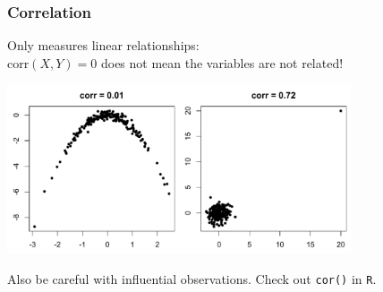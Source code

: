 \documentclass{beamer}
\newcommand{\rd}{\color{burntorange}}
\newcommand{\bk}{\color{black}}
\begin{document}
\begin{frame}
\frametitle{Correlation}

Only measures \rd linear \bk relationships: \\ \vspace{3mm} corr$(X,Y) =0 $ does not
mean the variables are not related!

\begin{center}
\includegraphics[width=4in]{figures/strangecor}
\end{center}
Also be careful with influential observations.  Check out {\tt cor()} in {\tt R}.

\end{frame}
%
%
%
%
%
%
%
\end{document}
